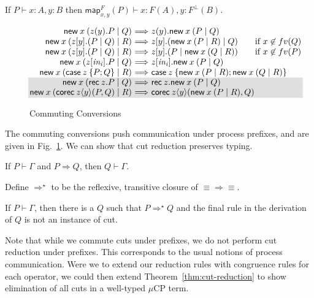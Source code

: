 \documentclass[orivec,envcountsame]{llncs}
\makeatletter
\newcommand{\cpdual}[1]{#1^\perp}
\newcommand{\cptyp}[2]{#1 \vdash #2}
\newcommand{\mapname}{\mathsf{map}}
\newcommand{\map}[3]{\mapname^{#1}_{#2}(#3)}
\newcommand{\mkwd}[1]{\mathsf{#1}}
\newcommand{\cut}[4]{\mkwd{new}\:#1 \: (#3 \mid #4)}
\newcommand{\rec}[1]{\mkwd{rec}\:#1}
\newcommand{\corec}[4]{\mkwd{corec}\:{#1} \langle #2 \rangle (#3,#4)}
\newcommand{\clabel}[1]{\mathit{#1}}
\renewcommand{\case}[2]{\mkwd{case}\:#1\:\{#2\}}
\newcommand{\sel}[2]{#1[\clabel{#2}]}
\newcommand{\mucp}{$\mu\mathrm{CP}$\xspace}
\newcommand{\ba}{\begin{array}}
\newcommand{\ea}{\end{array}}
\newenvironment{equations}{\[\ba{@{}r@{~}c@{~}l@{}}}{\ea\]}
\newcommand\shaderow{\noalign{\vskip-0.4pt}\rowcolor{shade}[0.6mm]}
\makeatother
\begin{document}
\begin{lemma}
  If $\cptyp{P}{x:A,y:B}$ then \(\cptyp{\map{F}{x,y}{P}}{x:F(A),y:\cpdual{F}(B)}.\)
\end{lemma}

\begin{figure}[float]
\small
\begin{equations}
  \cut{x}{A}{z(y).P}{Q} &\Longrightarrow& z(y).\cut{x}{A}{P}{Q} \\
  \cut{x}{A}{z[y].(P \mid Q)}{R} &\Longrightarrow& z[y].(\cut{x}{A}{P}{R} \mid Q) \text{\quad \quad if $x \not\in fv(Q)$} \\
  \cut{x}{A}{z[y].(P \mid Q)}{R} &\Longrightarrow& z[y].(P \mid \cut{x}{A}{Q}{R}) \text{\quad \quad if $x \not\in fv(P)$} \\
  \cut{x}{A}{\sel{z}{in_i}.P}{Q} &\Longrightarrow& \sel{z}{in_i}.\cut{x}{A}{P}{Q} \\
  \cut{x}{A}{\case{z}{P;Q}}{R} &\Longrightarrow& \case{z}{\cut{x}{A}{P}{R}; \cut{x}{A}{Q}{R}} \\ \shaderow
  \cut{x}{A}{\rec{z}.P}{Q} &\Longrightarrow& \rec{z}.\cut{x}{A}{P}{Q} \\ \shaderow
  \cut{x}{A}{\corec{z}{y}{P}{Q}}{R} &\Longrightarrow& \corec{z}{y}{\cut{x}{A}{P}{R}}{Q} \\
\end{equations}
\caption{Commuting Conversions}\label{fig:commuting}
\end{figure}

The commuting conversions push communication under process prefixes, and are given in
Fig.~\ref{fig:commuting}.  We can show that cut reduction preserves typing.

\begin{theorem}
  If $\cptyp{P}{\Gamma}$ and $P \Longrightarrow Q$, then $\cptyp{Q}{\Gamma}.$
\end{theorem}

Define $\Longrightarrow^\star$ to be the reflexive, transitive closure of $\equiv\Longrightarrow\equiv$.

\begin{theorem}\label{thm:cut-reduction}
  If $\cptyp{P}{\Gamma}$, then there is a $Q$ such that $P \Longrightarrow^\star Q$ and the final
  rule in the derivation of $Q$ is not an instance of cut.
\end{theorem}

Note that while we commute cuts under prefixes, we do not perform cut reduction under prefixes.
This corresponds to the usual notions of process communication.  Were we to extend our reduction
rules with congruence rules for each operator, we could then extend Theorem~\ref{thm:cut-reduction}
to show elimination of all cuts in a well-typed \mucp term.
\end{document}
